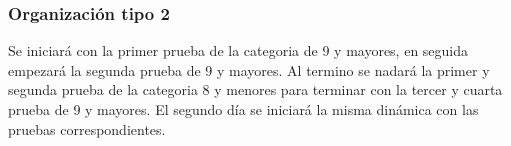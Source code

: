\subsubsection{Organización tipo 2}
Se iniciará con la primer prueba de la categoria de 9 y mayores, en seguida empezará la segunda prueba de 9 y mayores. Al termino se nadará la primer y segunda prueba de la categoria 8 y menores para terminar con la tercer y cuarta prueba de 9 y mayores.  El segundo día se iniciará la misma dinámica con las pruebas correspondientes.